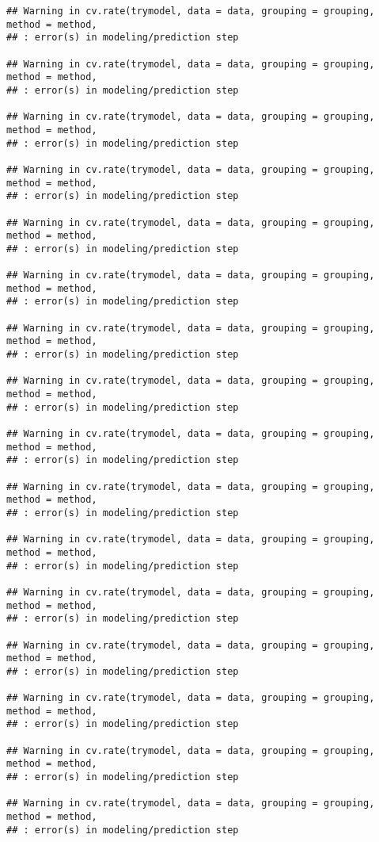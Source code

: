 \documentclass[
]{article}
\begin{document}
\begin{verbatim}
## Warning in cv.rate(trymodel, data = data, grouping = grouping, method = method,
## : error(s) in modeling/prediction step

## Warning in cv.rate(trymodel, data = data, grouping = grouping, method = method,
## : error(s) in modeling/prediction step

## Warning in cv.rate(trymodel, data = data, grouping = grouping, method = method,
## : error(s) in modeling/prediction step

## Warning in cv.rate(trymodel, data = data, grouping = grouping, method = method,
## : error(s) in modeling/prediction step

## Warning in cv.rate(trymodel, data = data, grouping = grouping, method = method,
## : error(s) in modeling/prediction step

## Warning in cv.rate(trymodel, data = data, grouping = grouping, method = method,
## : error(s) in modeling/prediction step

## Warning in cv.rate(trymodel, data = data, grouping = grouping, method = method,
## : error(s) in modeling/prediction step

## Warning in cv.rate(trymodel, data = data, grouping = grouping, method = method,
## : error(s) in modeling/prediction step

## Warning in cv.rate(trymodel, data = data, grouping = grouping, method = method,
## : error(s) in modeling/prediction step

## Warning in cv.rate(trymodel, data = data, grouping = grouping, method = method,
## : error(s) in modeling/prediction step

## Warning in cv.rate(trymodel, data = data, grouping = grouping, method = method,
## : error(s) in modeling/prediction step

## Warning in cv.rate(trymodel, data = data, grouping = grouping, method = method,
## : error(s) in modeling/prediction step

## Warning in cv.rate(trymodel, data = data, grouping = grouping, method = method,
## : error(s) in modeling/prediction step

## Warning in cv.rate(trymodel, data = data, grouping = grouping, method = method,
## : error(s) in modeling/prediction step

## Warning in cv.rate(trymodel, data = data, grouping = grouping, method = method,
## : error(s) in modeling/prediction step

## Warning in cv.rate(trymodel, data = data, grouping = grouping, method = method,
## : error(s) in modeling/prediction step


\end{verbatim}
\end{document}
